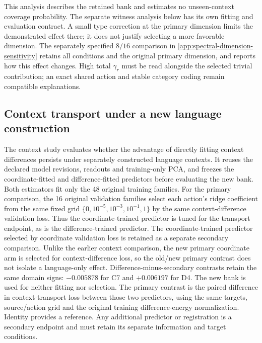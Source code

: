 This analysis describes the retained bank and estimates no unseen-context coverage probability. The separate witness analysis below has its own fitting and evaluation contract. A small type correction at the primary dimension limits the demonstrated effect there; it does not justify selecting a more favorable dimension. The separately specified $8/16$ comparison in \cref{app:spectral-dimension-sensitivity} retains all conditions and the original primary dimension, and reports how this effect changes. High total $\gamma_r$ must be read alongside the selected trivial contribution; an exact shared action and stable category coding remain compatible explanations.

\subsection{Context transport under a new language construction}
The context study evaluates whether the advantage of directly fitting context differences persists under separately constructed language contexts. It reuses the declared model revisions, readouts and training-only PCA, and freezes the coordinate-fitted and difference-fitted predictors before evaluating the new bank. Both estimators fit only the 48 original training families. For the primary comparison, the 16 original validation families select each action's ridge coefficient from the same fixed grid $\{0,10^{-5},10^{-3},10^{-1},1\}$ by the same context-difference validation loss. Thus the coordinate-trained predictor is tuned for the transport endpoint, as is the difference-trained predictor. The coordinate-trained predictor selected by coordinate validation loss is retained as a separate secondary comparison. Unlike the earlier context comparison, the new primary coordinate arm is selected for context-difference loss, so the old/new primary contrast does not isolate a language-only effect. Difference-minus-secondary contrasts retain the same domain signs: $-0.005878$ for C7 and $+0.006197$ for D4. The new bank is used for neither fitting nor selection. The primary contrast is the paired difference in context-transport loss between those two predictors, using the same targets, source/action grid and the original training difference-energy normalization. Identity provides a reference. Any additional predictor or registration is a secondary endpoint and must retain its separate information and target conditions.

